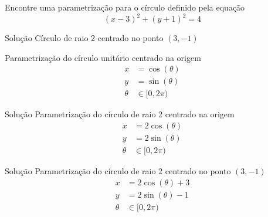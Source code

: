 \begin{question}
Encontre uma parametrização para o círculo definido pela equação
\[
  (x-3)^2 + (y+1)^2 = 4
\]
\end{question}

\begin{resolution}{Solução}
  Círculo de raio 2 centrado no ponto \((3, -1)\)

  Parametrização do círculo unitário centrado na origem
  \begin{align*}
    x      & = \cos(\theta) \\
    y      & = \sin(\theta) \\
    \theta & \in [0, 2\pi)
  \end{align*}
\end{resolution}

\begin{resolution}{Solução}
  Parametrização do círculo de raio 2 centrado na origem
  \begin{align*}
    x      & = 2\cos(\theta) \\
    y      & = 2\sin(\theta) \\
    \theta & \in [0, 2\pi)
  \end{align*}
\end{resolution}

\begin{resolution}{Solução}
  Parametrização do círculo de raio 2 centrado no ponto \((3, -1)\)
  \begin{align*}
  x      & = 2\cos(\theta) + 3 \\
  y      & = 2\sin(\theta) - 1 \\
  \theta & \in [0, 2\pi)
  \end{align*}
\end{resolution}

